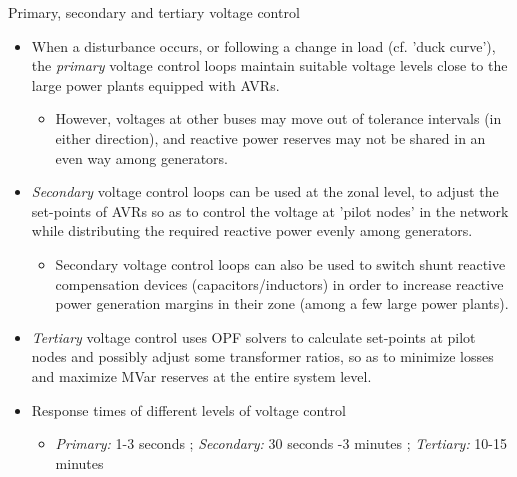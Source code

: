 \begin{frame}[allowframebreaks]{Primary, secondary and tertiary voltage control}
    \begin{itemize}
        \item When a disturbance occurs, or following a change in load (cf. 'duck curve'), the \textit{primary} voltage control loops maintain suitable voltage levels close to the large power plants equipped with AVRs.
        \begin{itemize}
            \item However, voltages at other buses may move out of tolerance intervals (in either direction), and reactive power reserves may not be shared in an even way among generators.
        \end{itemize}
        \item \textit{Secondary} voltage control loops can be used at the zonal level, to adjust the set-points of AVRs so as to control the voltage at 'pilot nodes' in the network while distributing the required reactive power evenly among generators.
        \begin{itemize}
            \item Secondary voltage control loops can also be used to switch shunt reactive compensation devices (capacitors/inductors) in order to increase reactive power generation margins in their zone (among a few large power plants).
        \end{itemize}
        \item \textit{Tertiary} voltage control uses OPF solvers to calculate set-points at pilot nodes and possibly adjust some transformer ratios, so as to minimize losses and maximize MVar reserves at the entire system level.
        \item Response times of different levels of voltage control
        \begin{itemize}
            \item \textit{Primary:} 1-3 seconds ; \textit{Secondary:} 30 seconds -3 minutes ; \textit{Tertiary:} 10-15 minutes
        \end{itemize}
    \end{itemize}
\end{frame}



